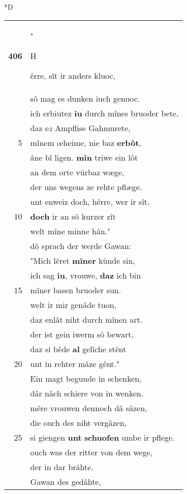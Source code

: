 \documentclass[8pt,a4paper,notitlepage]{article}
\begin{document}
\begin{table}[ht]
\begin{minipage}[t]{0.5\linewidth}
\small
\begin{center}*D
\end{center}
\begin{tabular}{rl}
\textbf{406} & "\begin{large}H\end{large}êrre, sît ir anders kluoc,\\ 
 & sô mag es dunken iuch genuoc.\\ 
 & ich erbiutez \textbf{iu} durch mînes bruoder bete,\\ 
 & daz e\textit{z} Ampflise Gahmurete,\\ 
5 & mînem œheime, nie baz \textbf{erbôt},\\ 
 & âne bî ligen. \textbf{mîn} triwe ein lôt\\ 
 & an dem orte vürbaz wæge,\\ 
 & der uns wegens ze rehte pflæge.\\ 
 & unt enweiz doch, hêrre, wer ir sît,\\ 
10 & \textbf{doch} ir an sô kurzer zît\\ 
 & welt mîne minne hân."\\ 
 & dô sprach der werde Gawan:\\ 
 & "Mich lêret \textbf{mîner} künde sin,\\ 
 & ich sag \textbf{iu}, vrouwe, \textbf{daz} ich bin\\ 
15 & mîner basen bruoder sun.\\ 
 & welt ir mir genâde tuon,\\ 
 & daz enlât niht durch mînen art.\\ 
 & der ist gein iwerm sô bewart,\\ 
 & daz si bêde \textbf{al} gelîche stênt\\ 
20 & unt in rehter mâze gênt."\\ 
 & Ein magt begunde in schenken,\\ 
 & dâr nâch schiere von in wenken.\\ 
 & mêre vrouwen dennoch dâ sâzen,\\ 
 & die ouch des niht vergâzen,\\ 
25 & si giengen \textbf{unt} \textbf{schuofen} umbe ir pflege.\\ 
 & ouch was der ritter von dem wege,\\ 
 & der in dar brâhte.\\ 
 & Gawan des gedâhte,\\ 

\end{tabular}
\end{minipage}
\end{table}
\end{document}
